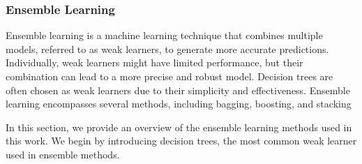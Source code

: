 \subsubsection{Ensemble Learning}
Ensemble learning is a machine learning technique that combines multiple models, referred to as weak learners, to generate more accurate predictions.
Individually, weak learners might have limited performance, but their combination can lead to a more precise and robust model.
Decision trees are often chosen as weak learners due to their simplicity and effectiveness.
Ensemble learning encompasses several methods, including bagging, boosting, and stacking\cite{James2023AnIS, pavlyshenko2018stacking}

In this section, we provide an overview of the ensemble learning methods used in this work.
We begin by introducing decision trees, the most common weak learner used in ensemble methods.
